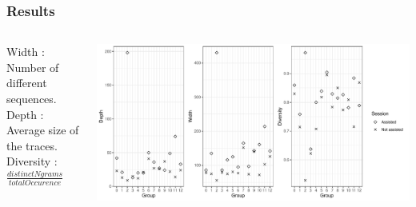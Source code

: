 \documentclass{beamer}
\begin{document}
\begin{frame}
    \frametitle{Results}
    \begin{columns}[T]
        \begin{column}{.35\textwidth}
            Width : Number of different sequences. \\
            Depth : Average size of the traces. \\
            Diversity : $\frac{distinctNgrams}{totalOccurence}$ \\
        \end{column}
        \begin{column}{.65\textwidth}
            \includegraphics[width=1\textwidth]{img/controlled-study.pdf}
        \end{column}
    \end{columns}
\end{frame}


\end{document}
